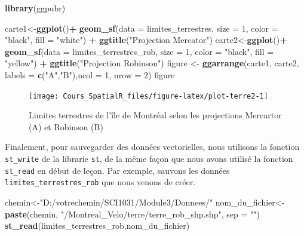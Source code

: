 \documentclass[
  12pt,
]{krantz}
\newenvironment{Shaded}{\begin{snugshade}}{\end{snugshade}}
\newcommand{\DataTypeTok}[1]{\textcolor[rgb]{0.13,0.29,0.53}{#1}}
\newcommand{\DecValTok}[1]{\textcolor[rgb]{0.00,0.00,0.81}{#1}}
\newcommand{\KeywordTok}[1]{\textcolor[rgb]{0.13,0.29,0.53}{\textbf{#1}}}
\newcommand{\NormalTok}[1]{#1}
\newcommand{\OperatorTok}[1]{\textcolor[rgb]{0.81,0.36,0.00}{\textbf{#1}}}
\newcommand{\StringTok}[1]{\textcolor[rgb]{0.31,0.60,0.02}{#1}}
\begin{document}
\begin{Shaded}
\begin{Highlighting}[]
\KeywordTok{library}\NormalTok{(ggpubr)}
\end{Highlighting}
\end{Shaded}

\begin{Shaded}
\begin{Highlighting}[]
\NormalTok{carte1<-}\KeywordTok{ggplot}\NormalTok{()}\OperatorTok{+}
\StringTok{  }\KeywordTok{geom_sf}\NormalTok{(}\DataTypeTok{data =}\NormalTok{ limites_terrestres, }\DataTypeTok{size =} \DecValTok{1}\NormalTok{, }\DataTypeTok{color =} \StringTok{"black"}\NormalTok{, }\DataTypeTok{fill =} \StringTok{"white"}\NormalTok{) }\OperatorTok{+}
\StringTok{  }\KeywordTok{ggtitle}\NormalTok{(}\StringTok{"Projection Mercator"}\NormalTok{)}
\NormalTok{carte2<-}\KeywordTok{ggplot}\NormalTok{()}\OperatorTok{+}
\StringTok{  }\KeywordTok{geom_sf}\NormalTok{(}\DataTypeTok{data =}\NormalTok{ limites_terrestres_rob, }\DataTypeTok{size =} \DecValTok{1}\NormalTok{, }\DataTypeTok{color =} \StringTok{"black"}\NormalTok{, }\DataTypeTok{fill =} \StringTok{"yellow"}\NormalTok{) }\OperatorTok{+}
\StringTok{  }\KeywordTok{ggtitle}\NormalTok{(}\StringTok{"Projection Robinson"}\NormalTok{)}
\NormalTok{figure <-}\StringTok{ }\KeywordTok{ggarrange}\NormalTok{(carte1, carte2, }\DataTypeTok{labels =} \KeywordTok{c}\NormalTok{(}\StringTok{"A"}\NormalTok{,}\StringTok{"B"}\NormalTok{),}\DataTypeTok{ncol =} \DecValTok{1}\NormalTok{, }\DataTypeTok{nrow =} \DecValTok{2}\NormalTok{)}
\NormalTok{figure}
\end{Highlighting}
\end{Shaded}

\begin{figure}

{\centering \texttt{[image: Cours\_SpatialR\_files/figure-latex/plot-terre2-1]} 

}

\caption{Limites terrestres de l'île de Montréal selon les projections Mercartor (A) et Robinson (B)}\label{fig:plot-terre2}
\end{figure}

Finalement, pour sauvegarder des données vectorielles, nous utilisons la fonction \texttt{st\_write} de la librarie \texttt{st}, de la même façon que nous avons utilisé la fonction \texttt{st\_read} en début de leçon. Par exemple, sauvons les données \texttt{limites\_terrestres\_rob} que nous venons de créer.

\begin{Shaded}
\begin{Highlighting}[]
\NormalTok{chemin<-}\StringTok{"D:/votrechemin/SCI1031/Module3/Donnees/"}
\NormalTok{nom_du_fichier<-}\StringTok{ }\KeywordTok{paste}\NormalTok{(chemin, }\StringTok{"/Montreal_Velo/terre/terre_rob_shp.shp"}\NormalTok{, }\DataTypeTok{sep =} \StringTok{""}\NormalTok{)}
\KeywordTok{st_read}\NormalTok{(limites_terrestres_rob,nom_du_fichier)}
\end{Highlighting}
\end{Shaded}
\end{document}
